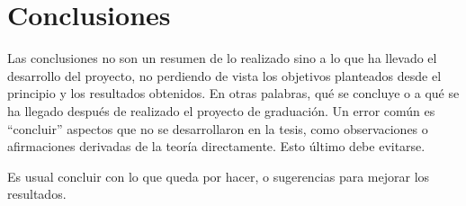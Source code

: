 \chapter{Conclusiones}

Las conclusiones no son un resumen de lo realizado sino a lo que ha llevado el
desarrollo del proyecto, no perdiendo de vista los objetivos planteados desde
el principio y los resultados obtenidos.  En otras palabras, qué se concluye o
a qué se ha llegado después de realizado el proyecto de graduación.  Un error
común es ``concluir'' aspectos que no se desarrollaron en la tesis, como
observaciones o afirmaciones derivadas de la teoría directamente.  Esto último
debe evitarse.

Es usual concluir con lo que queda por hacer, o sugerencias para mejorar los
resultados.


